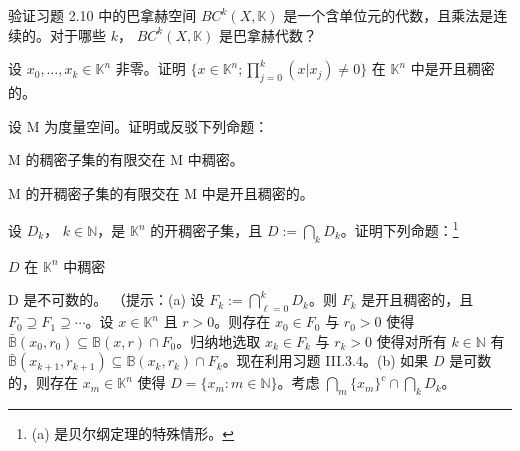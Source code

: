 \exerciseshead

\begin{exercises}
\item

验证习题 2.10 中的巴拿赫空间  $BC^k(X, \mathbb{K})$ 是一个含单位元的代数，且乘法是连续的。对于哪些  $k$， $BC^k(X, \mathbb{K})$ 是巴拿赫代数？

\item

设  $x_0, \ldots, x_k \in \mathbb{K}^n$ 非零。证明  $\{x \in \mathbb{K}^n; \prod_{j=0}^k (x | x_j) \neq 0\}$ 在  $\mathbb{K}^n$ 中是开且稠密的。

\item

设 M 为度量空间。证明或反驳下列命题：

\begin{items}
\item

M 的稠密子集的有限交在 M 中稠密。

\item

M 的开稠密子集的有限交在 M 中是开且稠密的。

\end{items}

\item

设  $D_k$， $k \in \mathbb{N}$，是  $\mathbb{K}^n$ 的开稠密子集，且  $D := \bigcap_k D_k$。证明下列命题：\footnote{(a) 是贝尔纲定理的特殊情形。}

\begin{items}
\item

$D$ 在 $\mathbb{K}^{n}$ 中稠密

\item

D 是不可数的。
（提示：(a) 设 $F_k := \bigcap_{\ell=0}^{k} D_k$。则 $F_k$ 是开且稠密的，且 $F_0 \supseteq F_1 \supseteq \cdots$。设 $x \in \mathbb{K}^n$ 且 $r > 0$。则存在 $x_0 \in F_0$ 与 $r_0 > 0$ 使得 $\bar{\mathbb{B}}(x_0, r_0) \subseteq \mathbb{B}(x, r) \cap F_0$。归纳地选取 $x_k \in F_k$ 与 $r_k > 0$ 使得对所有 $k \in \mathbb{N}$ 有 $\bar{\mathbb{B}}(x_{k+1}, r_{k+1}) \subseteq \mathbb{B}(x_k, r_k) \cap F_k$。现在利用习题 III.3.4。(b) 如果 $D$ 是可数的，则存在 $x_m \in \mathbb{K}^n$ 使得 $D = \{ x_m : m \in \mathbb{N} \}$。考虑 $\bigcap_m \{ x_m \}^c \cap \bigcap_k D_k$。

\end{items}

\item


\end{exercises}
